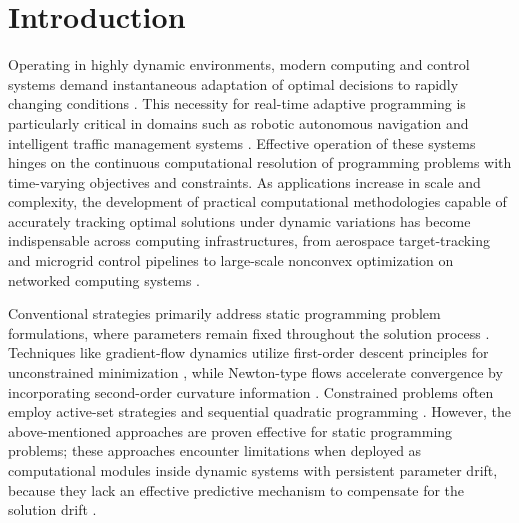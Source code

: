 \documentclass[pdflatex,sn-mathphys,Numbered]{sn-jnl}
\theoremstyle{thmstyleone}
\theoremstyle{thmstyletwo}
\theoremstyle{thmstylethree}
\begin{document}

\maketitle

\section{Introduction}\label{sec1}
Operating in highly dynamic environments, modern computing and control systems demand instantaneous adaptation of optimal decisions to rapidly changing conditions \cite{ldfy,acces23,trp2024}. This necessity for real-time adaptive programming is particularly critical in domains such as robotic autonomous navigation \cite{acceess4,trp2025,titis333} and intelligent traffic management systems \cite{acces345,titis2}. Effective operation of these systems hinges on the continuous computational resolution of programming problems with time-varying objectives and constraints. As applications increase in scale and complexity, the development of practical computational methodologies capable of accurately tracking optimal solutions under dynamic variations has become indispensable across computing infrastructures, from aerospace target-tracking and microgrid control pipelines \cite{tesagf, acceess3} to large-scale nonconvex optimization on networked computing systems \cite{TSTT12}.

Conventional strategies primarily address static programming problem formulations, where parameters remain fixed throughout the solution process \cite{tiify,siam1}. Techniques like gradient-flow dynamics utilize first-order descent principles for unconstrained minimization \cite{hwx2,aces355}, while Newton-type flows accelerate convergence by incorporating second-order curvature information \cite{trone3,newt1}. Constrained problems often employ active-set strategies \cite{act-se33,act-se} and sequential quadratic programming \cite{SQP3444, SQP34}. However, the above-mentioned approaches are proven effective for static programming problems; these approaches encounter limitations when deployed as computational modules inside dynamic systems with persistent parameter drift, because they lack an effective predictive mechanism to compensate for the solution drift \cite{S22, S44}.
\end{document}
